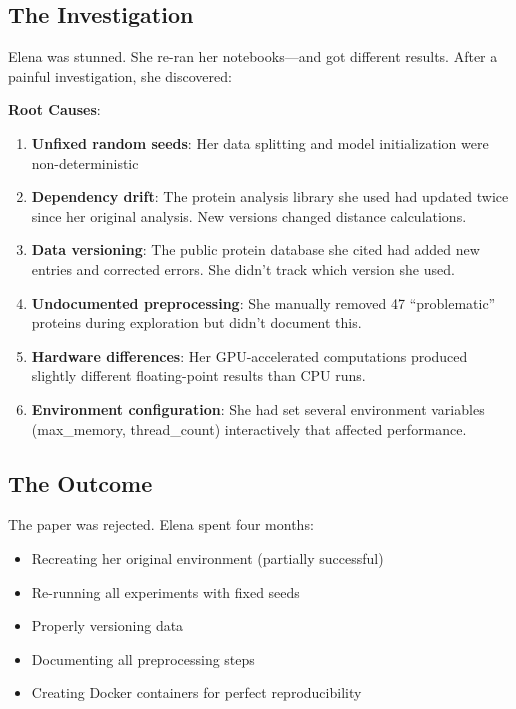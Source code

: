 \subsection{The Investigation}

Elena was stunned. She re-ran her notebooks---and got different results. After a painful investigation, she discovered:

\textbf{Root Causes}:

\begin{enumerate}
    \item \textbf{Unfixed random seeds}: Her data splitting and model initialization were non-deterministic

    \item \textbf{Dependency drift}: The protein analysis library she used had updated twice since her original analysis. New versions changed distance calculations.

    \item \textbf{Data versioning}: The public protein database she cited had added new entries and corrected errors. She didn't track which version she used.

    \item \textbf{Undocumented preprocessing}: She manually removed 47 ``problematic'' proteins during exploration but didn't document this.

    \item \textbf{Hardware differences}: Her GPU-accelerated computations produced slightly different floating-point results than CPU runs.

    \item \textbf{Environment configuration}: She had set several environment variables (max\_memory, thread\_count) interactively that affected performance.
\end{enumerate}

\subsection{The Outcome}

The paper was rejected. Elena spent four months:

\begin{itemize}
    \item Recreating her original environment (partially successful)
    \item Re-running all experiments with fixed seeds
    \item Properly versioning data
    \item Documenting all preprocessing steps
    \item Creating Docker containers for perfect reproducibility
\end{itemize}

